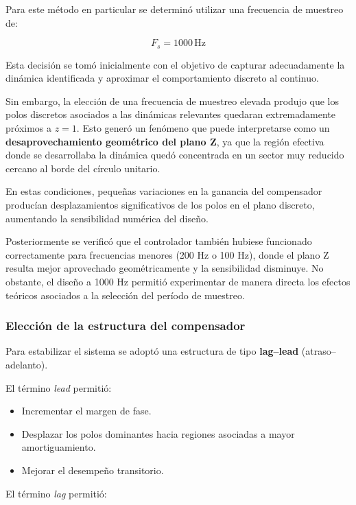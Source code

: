 Para este método en particular se determinó utilizar una frecuencia de muestreo de:

\[
F_s = 1000\,\text{Hz}
\]

Esta decisión se tomó inicialmente con el objetivo de capturar adecuadamente la dinámica identificada y aproximar el comportamiento discreto al continuo.

Sin embargo, la elección de una frecuencia de muestreo elevada produjo que los polos discretos asociados a las dinámicas relevantes quedaran extremadamente próximos a \(z=1\). Esto generó un fenómeno que puede interpretarse como un \textbf{desaprovechamiento geométrico del plano Z}, ya que la región efectiva donde se desarrollaba la dinámica quedó concentrada en un sector muy reducido cercano al borde del círculo unitario.

En estas condiciones, pequeñas variaciones en la ganancia del compensador producían desplazamientos significativos de los polos en el plano discreto, aumentando la sensibilidad numérica del diseño.

Posteriormente se verificó que el controlador también hubiese funcionado correctamente para frecuencias menores (200 Hz o 100 Hz), donde el plano Z resulta mejor aprovechado geométricamente y la sensibilidad disminuye. No obstante, el diseño a 1000 Hz permitió experimentar de manera directa los efectos teóricos asociados a la selección del período de muestreo.

\subsubsection{Elección de la estructura del compensador}

Para estabilizar el sistema se adoptó una estructura de tipo \textbf{lag--lead} (atraso--adelanto).

El término \textit{lead} permitió:

\begin{itemize}
	\item Incrementar el margen de fase.
	\item Desplazar los polos dominantes hacia regiones asociadas a mayor amortiguamiento.
	\item Mejorar el desempeño transitorio.
\end{itemize}

El término \textit{lag} permitió:

